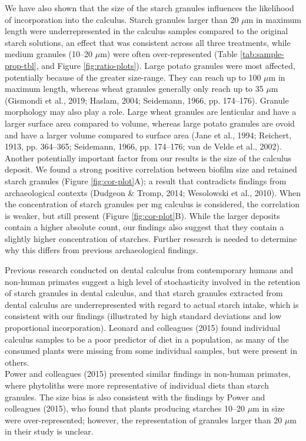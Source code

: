 \documentclass[
]{article}
\begin{document}
We have also shown that the size of the starch granules influences the likelihood
of incorporation into the calculus. Starch granules larger than 20 \(\mu\)m in
maximum length were underrepresented in the calculus samples compared to the original
starch solutions, an effect that was consistent across all three treatments,
while medium granules (10--20 \(\mu\)m) were often over-represented
(Table \ref{tab:sample-prop-tbl},
and
Figure \ref{fig:ratio-plots}).
Large potato granules were most affected, potentially because of the greater
size-range. They can reach up to 100 \(\mu\)m in maximum length, whereas wheat
granules generally only reach up to 35 \(\mu\)m
(Gismondi et al., 2019; Haslam, 2004; Seidemann, 1966, pp. 174--176).
Granule morphology may also play a role. Large wheat granules
are lenticular and have a larger surface area compared
to volume, whereas large potato granules are ovoid and have a larger volume
compared to surface area
(Jane et al., 1994; Reichert, 1913, pp. 364--365; Seidemann, 1966, pp. 174--176; van de Velde et al., 2002).
Another potentially important factor
from our results is the size of the calculus deposit. We found a
strong positive correlation between biofilm size and retained
starch granules (Figure \ref{fig:cor-plot}A);
a result that contradicts findings from archaeological contexts
(Dudgeon \& Tromp, 2014; Wesolowski et al., 2010).
When the concentration of starch granules
per mg calculus is considered, the correlation is weaker, but still present
(Figure \ref{fig:cor-plot}B).
While the larger deposits contain a higher absolute count, our findings also suggest
that they contain a slightly higher concentration of starches.
Further research is needed to determine why this differs from previous archaeological
findings.

Previous research conducted on dental calculus from contemporary humans and non-human
primates suggest a high level of stochasticity involved in the retention of
starch granules in dental calculus, and that starch granules extracted from dental
calculus are underrepresented with regard
to actual starch intake, which is consistent with our findings (illustrated by high
standard deviations and low proportional incorporation).
Leonard and colleagues (2015) found individual
calculus samples to be a poor predictor of diet in a population, as many of the
consumed plants were missing from some individual samples, but were present in others.\\
Power and colleagues (2015)
presented similar findings in non-human primates, where phytoliths were more
representative of individual diets than starch granules.
The size bias is also consistent with the findings by Power and colleagues
(2015),
who found that plants producing starches 10--20 \(\mu\)m in
size were over-represented; however, the representation of granules larger than
20 \(\mu\)m in their study is unclear.
\end{document}
